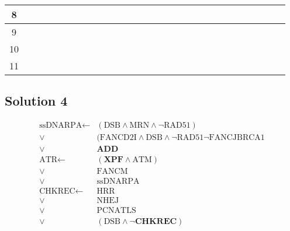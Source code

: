 \documentclass[a4paper,10pt]{article}
\begin{document}
\begin{table}
\begin{tabular}{|c|c|c|c|c|c|c|c|c|c|c|c|c|c|c|c|c|c|c|c|c|c|c|c|c|c|c|c|c|}
{\small 8} &  &  &  &  &  &  &  &  & \cellcolor{gray} & \cellcolor{gray} &  &  &  &  &  &  &  &  &  & \cellcolor{gray} &  &  & \cellcolor{gray} & \cellcolor{gray} &  &  &  &  \\ \hline
{\small 9} &  &  &  &  &  &  &  &  &  &  &  &  &  & \cellcolor{gray} &  &  &  & \cellcolor{gray} &  &  & \cellcolor{gray} & \cellcolor{gray} &  &  &  &  &  & \cellcolor{gray} \\ \hline
{\small 10} &  &  &  &  &  &  &  &  &  &  &  &  &  &  &  &  &  &  &  &  &  &  &  &  &  &  &  &  \\ \hline
{\small 11} &  &  &  &  &  &  &  &  &  &  &  &  &  &  &  &  &  &  &  &  &  &  &  &  &  &  &  & \cellcolor{gray} \\ \hline
\end{tabular}\end{table}
\FloatBarrier
\subsection{Solution 4}

\begin{align*}
 \textrm{ssDNARPA} \leftarrow &(\textrm{DSB} \land \textrm{MRN} \land \neg \textrm{RAD51}) \\
 \lor &(\textrm{FANCD2I} \land \textrm{DSB} \land \neg \textrm{RAD51} \neg \textrm{FANCJBRCA1} \\
 \lor &\mathbf{ADD} \\
 \textrm{ATR} \leftarrow &(\mathbf{XPF} \land \textrm{ATM}) \\
 \lor &\textrm{FANCM} \\
 \lor &\textrm{ssDNARPA} \\
 \textrm{CHKREC} \leftarrow &\textrm{HRR} \\
 \lor &\textrm{NHEJ} \\
 \lor &\textrm{PCNATLS} \\
 \lor &(\textrm{DSB} \land \mathbf{\neg CHKREC})
\end{align*}
\end{document}
